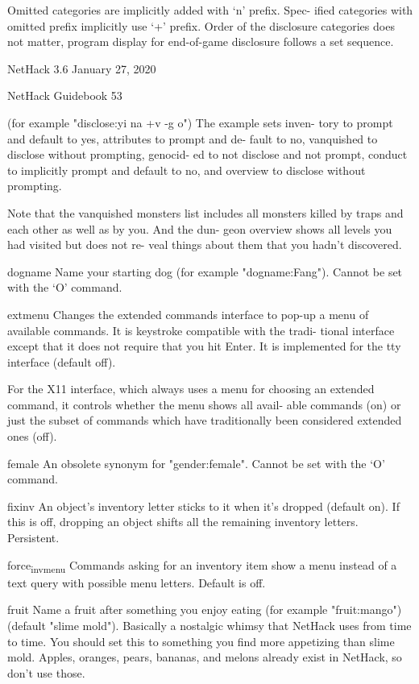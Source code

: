 \documentclass[11pt]{article}
\begin{document}
Omitted categories are implicitly added with `n' prefix. Spec-
ified categories with omitted prefix implicitly use `+' prefix.
Order of the disclosure categories does not matter, program
display for end-of-game disclosure follows a set sequence.


NetHack 3.6                   January 27, 2020


NetHack Guidebook                       53



(for example "disclose:yi na +v -g o") The example sets inven-
tory to prompt and default to yes, attributes to prompt and de-
fault to no, vanquished to disclose without prompting, genocid-
ed to not disclose and not prompt, conduct to implicitly prompt
and default to no, and overview to disclose without prompting.

Note that the vanquished monsters list includes all monsters
killed by traps and each other as well as by you. And the dun-
geon overview shows all levels you had visited but does not re-
veal things about them that you hadn't discovered.

dogname
 Name your starting dog (for example "dogname:Fang"). Cannot be
 set with the `O' command.

extmenu
 Changes the extended commands interface to pop-up a menu of
 available commands. It is keystroke compatible with the tradi-
 tional interface except that it does not require that you hit
 Enter. It is implemented for the tty interface (default off).

For the X11 interface, which always uses a menu for choosing an
extended command, it controls whether the menu shows all avail-
able commands (on) or just the subset of commands which have
traditionally been considered extended ones (off).

female
 An obsolete synonym for "gender:female". Cannot be set with
 the `O' command.

fixinv
 An object's inventory letter sticks to it when it's dropped
 (default on).  If this is off, dropping an object shifts all
 the remaining inventory letters. Persistent.

force\textsubscript{invmenu}
 Commands asking for an inventory item show a menu instead of a
 text query with possible menu letters. Default is off.

fruit
 Name a fruit after something you enjoy eating (for example
 "fruit:mango") (default "slime mold"). Basically a nostalgic
 whimsy that NetHack uses from time to time. You should set
 this to something you find more appetizing than slime mold.
 Apples, oranges, pears, bananas, and melons already exist in
 NetHack, so don't use those.
\end{document}
